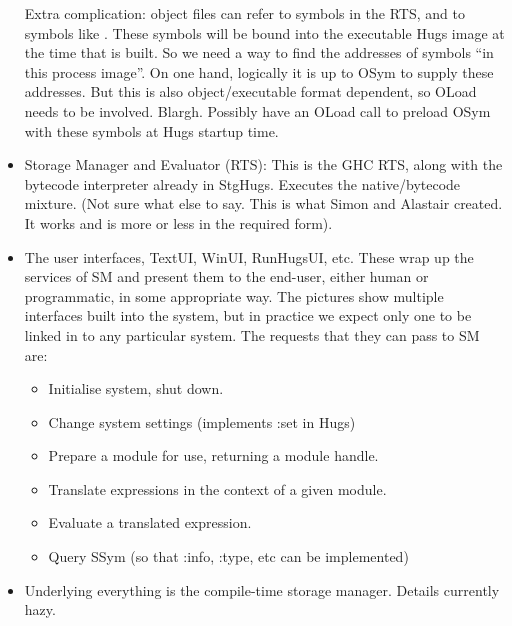 \begin{itemize}
  Extra complication: object files can refer to symbols in the RTS,
  and to symbols like .  These symbols will be bound into the
  executable Hugs image at the time that is built.   So we need a
  way to find the addresses of symbols ``in this process image''.  On
  one hand, logically it is up to OSym to supply these addresses.  But
  this is also object/executable format dependent, so OLoad needs to
  be involved.  Blargh.  Possibly have an OLoad call to preload 
  OSym with these symbols at Hugs startup time.


\item
  Storage Manager and Evaluator (RTS): This is the GHC RTS,
  along with the bytecode interpreter already in StgHugs.  Executes the
  native/bytecode mixture.  (Not sure what else to say.  This is
  what Simon and Alastair created.  It works and is more or less in
  the required form).


\item
  The user interfaces, TextUI, WinUI, RunHugsUI, etc.  These wrap up
  the services of SM and present them to the end-user, either human
  or programmatic, in some
  appropriate way.  The pictures show multiple interfaces built into
  the system, but in practice we expect only one to be linked in to
  any particular system.  The requests that they can pass to SM are:
  \begin{itemize}
  \item Initialise system, shut down.
  \item Change system settings (implements :set in Hugs)
  \item Prepare a module for use, returning a module handle.
  \item Translate expressions in the context of a given module.
  \item Evaluate a translated expression.
  \item Query SSym (so that :info, :type, etc can be implemented)
  \end{itemize}

\item
  Underlying everything is the compile-time storage manager.
  Details currently hazy.
\end{itemize}

